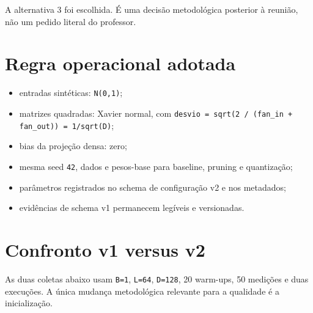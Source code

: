 A alternativa 3 foi escolhida. É uma decisão metodológica posterior à reunião, não um pedido literal do professor.



\section{Regra operacional adotada}


\begin{itemize}
\item entradas sintéticas: \texttt{N(0,1)};
\item matrizes quadradas: Xavier normal, com
\texttt{desvio = sqrt(2 /\allowbreak{} (fan\_\allowbreak{}in + fan\_\allowbreak{}out)) = 1/\allowbreak{}sqrt(D)};
\item bias da projeção densa: zero;
\item mesma seed \texttt{42}, dados e pesos-base para baseline, pruning e quantização;
\item parâmetros registrados no schema de configuração v2 e nos metadados;
\item evidências de schema v1 permanecem legíveis e versionadas.
\end{itemize}


\section{Confronto v1 versus v2}





As duas coletas abaixo usam \texttt{B=1}, \texttt{L=64}, \texttt{D=128}, 20 warm-ups, 50 medições e duas execuções. A única mudança metodológica relevante para a qualidade é a inicialização.



